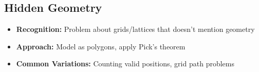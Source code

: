 
\subsection{Hidden Geometry}

\begin{pattern}
    \begin{itemize}
        \item \textbf{Recognition:} Problem about grids/lattices that doesn't mention geometry
        \item \textbf{Approach:} Model as polygons, apply Pick's theorem
        \item \textbf{Common Variations:} Counting valid positions, grid path problems
    \end{itemize}
\end{pattern} 